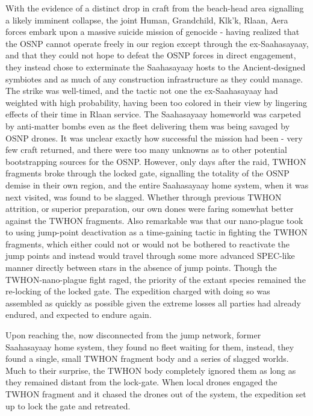 With the evidence of a distinct drop in craft from the beach-head area signalling a likely imminent collapse, the joint Human, Grandchild, Klk'k, Rlaan, Aera forces embark upon a massive suicide mission of genocide - having realized that the OSNP cannot operate freely in our region except through the ex-Saahasayaay, and that they could not hope to defeat the OSNP forces in direct engagement, they instead chose to exterminate the Saahasayaay hosts to the Ancient-designed symbiotes and as much of any construction infrastructure as they could manage. The strike was well-timed, and the tactic not one the ex-Saahasayaay had weighted with high probability, having been too colored in their view by lingering effects of their time in Rlaan service. The Saahasayaay homeworld was carpeted by anti-matter bombs even as the fleet delivering them was being savaged by OSNP drones. It was unclear exactly how successful the mission had been - very few craft returned, and there were too many unknowns as to other potential bootstrapping sources for the OSNP. However, only days after the raid, TWHON fragments broke through the locked gate, signalling the totality of the OSNP demise in their own region, and the entire Saahasayaay home system, when it was next visited, was found to be slagged. Whether through previous TWHON attrition, or superior preparation, our own dones were faring somewhat better against the TWHON fragments. Also remarkable was that our nano-plague took to using jump-point deactivation as a time-gaining tactic in fighting the TWHON fragments, which either could not or would not be bothered to reactivate the jump points and instead would travel through some more advanced SPEC-like manner directly between stars in the absence of jump points. Though the TWHON-nano-plague fight raged, the priority of the extant species remained the re-locking of the locked gate. The expedition charged with doing so was assembled as quickly as possible given the extreme losses all parties had already endured, and expected to endure again. 

Upon reaching the, now disconnected from the jump network, former Saahasayaay home system, they found no fleet waiting for them, instead, they found a single, small TWHON fragment body and a series of slagged worlds. Much to their surprise, the TWHON body completely ignored them as long as they remained distant from the lock-gate. When local drones engaged the TWHON fragment and it chased the drones out of the system, the expedition set up to lock the gate and retreated. 

